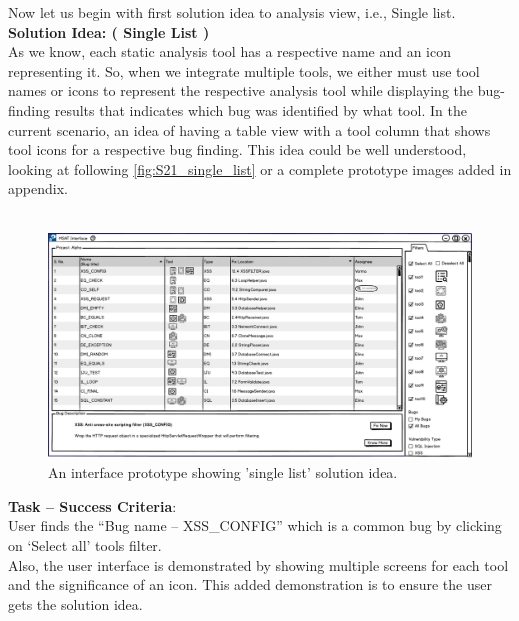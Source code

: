 Now let us begin with first solution idea to analysis view, i.e., Single list. \\

\textbf{Solution Idea: ( Single List )} \\

As we know, each static analysis tool has a respective name and an icon representing it. So, when we integrate multiple tools, we either must use tool names or icons to represent the respective analysis tool while displaying the bug-finding results that indicates which bug was identified by what tool. In the current scenario, an idea of having a table view with a tool column that shows tool icons for a respective bug finding. This idea could be well understood, looking at following  \autoref{fig:S21_single_list} or a complete prototype images added in appendix. \\ \\


\begin{figure}[hbt!]
	\centering
	\includegraphics[width=\linewidth]{figures/solution_ideas_snaps/S21_single_list}
	\caption{An interface prototype showing 'single list' solution idea.}
	\label{fig:S21_single_list}
\end{figure} 

\textbf{Task – Success Criteria}: \\

User finds the “Bug name – XSS\_CONFIG” which is a common bug by clicking on ‘Select all’ tools filter. \\

Also, the user interface is demonstrated by showing multiple screens for each tool and the significance of an icon. This added demonstration is to ensure the user gets the solution idea. \\ \\

